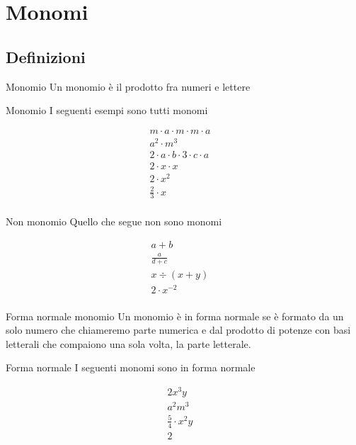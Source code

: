 \chapter{Monomi}
\label{cha:monomi}
\section{Definizioni}
\begin{definizionet}{Monomio}{}
	Un monomio è il prodotto fra numeri e lettere
\end{definizionet}
\begin{esempiot}{Monomio}{}
I seguenti esempi sono tutti monomi
\end{esempiot}
\begin{align*}
	m\cdot a\cdot m\cdot m\cdot a&\\
	a^2\cdot m^3&\\
	2\cdot a\cdot b\cdot3\cdot c\cdot a&\\
	2\cdot x\cdot x&\\
		2\cdot x^2&\\
		\frac{2}{3}\cdot x&\\
\end{align*}
\begin{esempiot}{Non monomio}{}
Quello che segue  non sono monomi
\end{esempiot}
\begin{align*}
a+b&\\
\frac{a}{d+c}&\\
x\div(x+y)&\\
		2\cdot x^{-2}&\\
\end{align*}
\begin{definizionet}{Forma normale monomio}{}
Un monomio è  in forma normale se è formato da un solo numero che chiameremo parte numerica e dal prodotto di potenze con basi letterali che compaiono una sola volta, la parte letterale.
\end{definizionet}
\begin{esempiot}{Forma normale}{}
	I seguenti monomi sono in forma normale
\end{esempiot}
\begin{align*}
	2x^3y&\\
	a^2m^3&\\
	\frac{5}{4}\cdot x^2y&\\
	2&\\
\end{align*}
